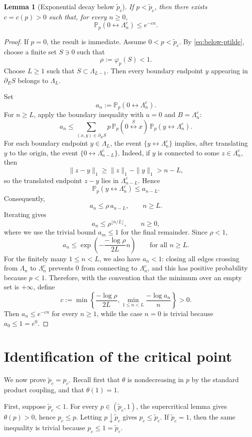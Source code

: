 \documentclass[11pt]{article}
\newtheorem{lemma}{Lemma}
\newcommand{\Pp}{\mathbb P_p}
\newcommand{\conn}{\longleftrightarrow}
\newcommand{\phip}{\varphi_p}
\newcommand{\pct}{\widetilde p_c}
\begin{document}
\begin{lemma}[Exponential decay below $\pct$]
If $p<\pct$, then there exists $c=c(p)>0$ such that, for every $n\ge0$,
\[
 \Pp(0\conn \Lambda_n^c)\le e^{-cn}.
\]
\end{lemma}

\begin{proof}
If $p=0$, the result is immediate. Assume $0<p<\pct$. By \eqref{eq:below-ptilde}, choose a finite set $S\ni0$ such that
\[
 \rho:=\phip(S)<1.
\]
Choose $L\ge1$ such that $S\subset\Lambda_{L-1}$. Then every boundary endpoint $y$ appearing in $\partial_E S$ belongs to $\Lambda_L$.

Set
\[
 a_n:=\Pp(0\conn \Lambda_n^c).
\]
For $n\ge L$, apply the boundary inequality with $u=0$ and $B=\Lambda_n^c$:
\[
 a_n
 \le
 \sum_{(x,y)\in\partial_E S}
 p\,\Pp(0\stackrel{S}{\conn}x)\,\Pp(y\conn \Lambda_n^c).
\]
For each boundary endpoint $y\in\Lambda_L$, the event $\{y\conn\Lambda_n^c\}$ implies, after translating $y$ to the origin, the event $\{0\conn\Lambda_{n-L}^c\}$. Indeed, if $y$ is connected to some $z\in\Lambda_n^c$, then
\[
 \|z-y\|_1\ge \|z\|_1-\|y\|_1>n-L,
\]
so the translated endpoint $z-y$ lies in $\Lambda_{n-L}^c$. Hence
\[
 \Pp(y\conn\Lambda_n^c)
 \le
 a_{n-L}.
\]
Consequently,
\[
 a_n\le \rho\,a_{n-L},
 \qquad n\ge L.
\]
Iterating gives
\[
 a_n\le \rho^{\lfloor n/L\rfloor},
 \qquad n\ge0,
\]
where we use the trivial bound $a_m\le1$ for the final remainder. Since $\rho<1$,
\[
 a_n\le \exp\!\left(-\frac{-\log\rho}{2L}n\right)
 \qquad\text{for all }n\ge L.
\]
For the finitely many $1\le n<L$, we also have $a_n<1$: closing all edges crossing from $\Lambda_n$ to $\Lambda_n^c$ prevents $0$ from connecting to $\Lambda_n^c$, and this has positive probability because $p<1$. Therefore, with the convention that the minimum over an empty set is $+\infty$, define
\[
 c:=\min\left\{
 \frac{-\log\rho}{2L},
 \min_{1\le n<L}\frac{-\log a_n}{n}
 \right\}>0.
\]
Then $a_n\le e^{-cn}$ for every $n\ge1$, while the case $n=0$ is trivial because $a_0\le1=e^0$.
\end{proof}

\section{Identification of the critical point}

We now prove $\pct=p_c$. Recall first that $\theta$ is nondecreasing in $p$ by the standard product coupling, and that $\theta(1)=1$.

First, suppose $\pct<1$. For every $p\in(\pct,1)$, the supercritical lemma gives $\theta(p)>0$, hence $p_c\le p$. Letting $p\downarrow\pct$ gives $p_c\le\pct$. If $\pct=1$, then the same inequality is trivial because $p_c\le1=\pct$.
\end{document}
